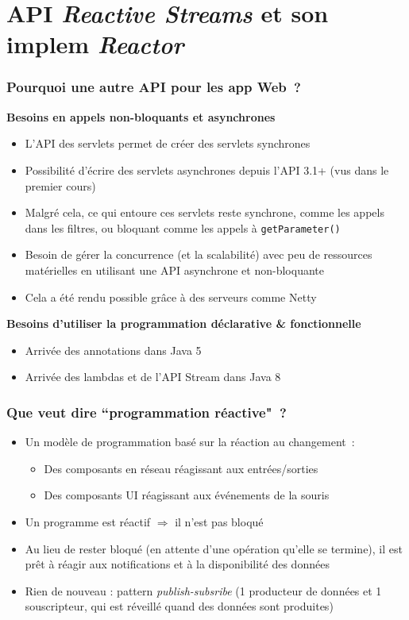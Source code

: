 \documentclass{beamer}
\begin{document}
\section{API \textit{Reactive Streams} et son implem \textit{Reactor}}
\begin{frame}
  \frametitle{Pourquoi une autre API pour les app Web~?}
  \textbf{Besoins en appels non-bloquants et asynchrones}
  \begin{itemize}
  \item L'API des servlets permet de créer des servlets synchrones
  \item Possibilité d'écrire des servlets asynchrones depuis l'API 3.1+ (vus dans le premier cours)
  \item Malgré cela, ce qui entoure ces servlets reste synchrone, comme les appels dans les filtres, ou bloquant comme les appels à \texttt{getParameter()}
  \item Besoin de gérer la concurrence (et la scalabilité) avec peu de ressources matérielles en utilisant une API asynchrone et non-bloquante
  \item Cela a été rendu possible grâce à des serveurs comme Netty
\end{itemize}
  \textbf{Besoins d'utiliser la programmation déclarative \& fonctionnelle}
  \begin{itemize}
  	\item Arrivée des annotations dans Java 5
  	\item Arrivée des lambdas et de l'API Stream dans Java 8
  \end{itemize}
\end{frame}

\begin{frame}
	\frametitle{Que veut dire ``programmation réactive"~?}
	\begin{itemize}
		\item Un modèle de programmation basé sur la réaction au changement~:
		\begin{itemize}
			\item Des composants en réseau réagissant aux entrées/sorties
			\item Des composants UI réagissant aux événements de la souris
		\end{itemize}
	\item Un programme est réactif $\Rightarrow$ il n'est pas bloqué
	\item Au lieu de rester bloqué (en attente d'une opération qu'elle se termine), il est prêt à réagir aux notifications et à la disponibilité des données
	\item Rien de nouveau : pattern \textit{publish-subsribe} (1 producteur de données et 1 souscripteur, qui est réveillé quand des données sont produites)
\end{itemize}
\end{frame}
\end{document}
